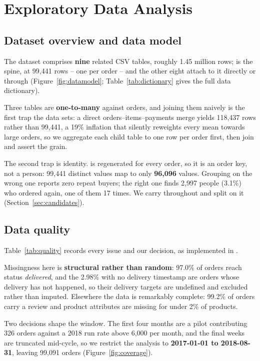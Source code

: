 \section{Exploratory Data Analysis}

\subsection{Dataset overview and data model}

The dataset comprises \textbf{nine} related CSV tables, roughly 1.45 million
rows;  is the spine, at 99{,}441 rows -- one per order -- and the
other eight attach to it directly or through 
(Figure~\ref{fig:datamodel}; Table~\ref{tab:dictionary} gives the full data
dictionary).

Three tables are \textbf{one-to-many} against orders, and joining them naively is
the first trap the data sets: a direct orders--items--payments merge yields
118{,}437 rows rather than 99{,}441, a 19\% inflation that silently reweights
every mean towards large orders, so we aggregate each child table to one row per
order first, then join and assert the grain.

The second trap is identity.  is regenerated for every order,
so it is an order key, not a person: 99{,}441 distinct values map to only
\textbf{96{,}096}  values. Grouping on the wrong one
reports zero repeat buyers; the right one finds 2{,}997 people (3.1\%) who
ordered again, one of them 17 times. We carry 
throughout and split on it (Section~\ref{sec:candidates}).

\subsection{Data quality}

Table~\ref{tab:quality} records every issue and our decision, as implemented in
.

Missingness here is \textbf{structural rather than random}: 97.0\% of orders reach
status \emph{delivered}, and the 2.98\% with no delivery timestamp are orders
whose delivery has not happened, so their delivery targets are undefined and
excluded rather than imputed. Elsewhere the data is remarkably complete: 99.2\%
of orders carry a review and product attributes are missing for under 2\% of
products.

Two decisions shape the window. The first four months are a pilot contributing 326
orders against a 2018 run rate above 6{,}000 per month, and the final weeks are
truncated mid-cycle, so we restrict the analysis to \textbf{2017-01-01 to
2018-08-31}, leaving 99{,}091 orders (Figure~\ref{fig:coverage}).


